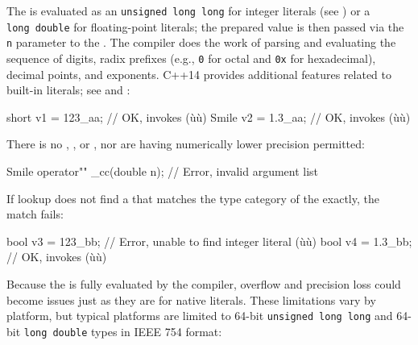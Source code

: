 \noindent The  is evaluated as an
\lstinline!unsigned!~\lstinline!long!~\lstinline!long! for integer literals (see ) or a
\lstinline!long!~\lstinline!double! for floating-point literals; the prepared
value is then passed via the \lstinline!n! parameter to the . The compiler does the work of parsing and evaluating the
sequence of digits, radix prefixes (e.g., \lstinline!0! for octal and
\lstinline!0x! for hexadecimal), decimal points, and exponents. C++14
provides additional features related to built-in
literals; see  and :

\begin{emcppslisting}[emcppsbatch=e10]
short v1 = 123_aa;  // OK, invokes (ù{}ù)
Smile v2 = 1.3_aa;  // OK, invokes (ù{}ù)
\end{emcppslisting}
    
\noindent There is no ,
, or
, nor are  having numerically lower precision permitted:

\begin{emcppslisting}[emcppsbatch=e10]
Smile operator"" _cc(double n);  // Error, invalid argument list
\end{emcppslisting}
    
\noindent If lookup does not find a  that matches the type
category of the  exactly, the match fails:

\begin{emcppslisting}[emcppsbatch=e10]
bool v3 = 123_bb;  // Error, unable to find integer literal (ù{}ù)
bool v4 = 1.3_bb;  // OK, invokes (ù{}ù)
\end{emcppslisting}
    
\noindent Because the  is fully evaluated by the compiler,
overflow and precision loss could become issues just as they are for
native literals. These limitations vary by platform, but typical
platforms are limited to 64-bit
\lstinline!unsigned!~\lstinline!long!~\lstinline!long! and 64-bit
\lstinline!long!~\lstinline!double! types in IEEE
754 format:

